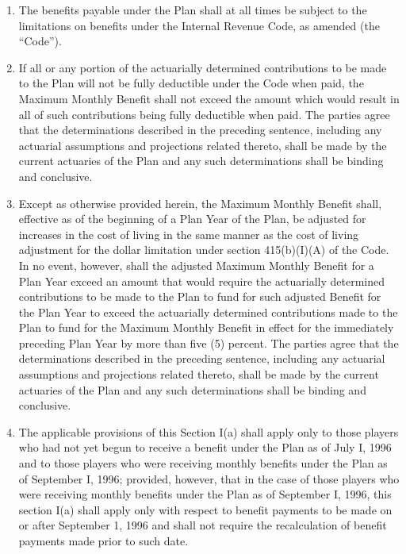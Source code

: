 \documentclass[
]{book}
\providecommand{\tightlist}{%
  \setlength{\itemsep}{0pt}\setlength{\parskip}{0pt}}
\begin{document}
\begin{enumerate}
\begin{enumerate}
\begin{enumerate}
      \begin{enumerate}
      \def\labelenumiv{(\Alph{enumiv})}
      \tightlist
      \item
        The benefits payable under the Plan shall at all times be subject to the limitations on benefits under the Internal Revenue Code, as amended (the ``Code'').
      \item
        If all or any portion of the actuarially determined contributions to be made to the Plan will not be fully deductible under the Code when paid, the Maximum Monthly Benefit shall not exceed the amount which would result in all of such contributions being fully deductible when paid. The parties agree that the determinations described in the preceding sentence, including any actuarial assumptions and projections related thereto, shall be made by the current actuaries of the Plan and any such determinations shall be binding and conclusive.
      \item
        Except as otherwise provided herein, the Maximum Monthly Benefit shall, effective as of the beginning of a Plan Year of the Plan, be adjusted for increases in the cost of living in the same manner as the cost of living adjustment for the dollar limitation under section 415(b)(I)(A) of the Code. In no event, however, shall the adjusted Maximum Monthly Benefit for a Plan Year exceed an amount that would require the actuarially determined contributions to be made to the Plan to fund for such adjusted Benefit for the Plan Year to exceed the actuarially determined contributions made to the Plan to fund for the Maximum Monthly Benefit in effect for the immediately preceding Plan Year by more than five (5) percent. The parties agree that the determinations described in the preceding sentence, including any actuarial assumptions and projections related thereto, shall be made by the current actuaries of the Plan and any such determinations shall be binding and conclusive.
      \item
        The applicable provisions of this Section I(a) shall apply only to those players who had not yet begun to receive a benefit under the Plan as of July I, 1996 and to those players who were receiving monthly benefits under the Plan as of September I, 1996; provided, however, that in the case of those players who were receiving monthly benefits under the Plan as of September I, 1996, this section I(a) shall apply only with respect to benefit payments to be made on or after September 1, 1996 and shall not require the recalculation of benefit payments made prior to such date.

\end{enumerate}
\end{enumerate}
\end{enumerate}
\end{enumerate}
\end{document}
